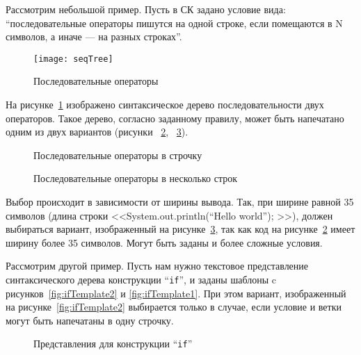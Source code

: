 Рассмотрим небольшой пример.
Пусть в СК задано условие вида: “последовательные операторы пишутся
на одной строке,
если помещаются в N символов, а иначе --- на разных строках”.

\begin{figure}[h!]
	\centering
	\texttt{[image: seqTree]}
	\caption{Последовательные операторы}
	\label{fig:seqImage}
\end{figure}

На рисунке~\ref{fig:seqImage} изображено синтаксическое дерево
последовательности двух операторов. Такое дерево, согласно заданному
правилу, может быть напечатано одним из
двух вариантов (рисунки ~\ref{fig:seqCode1}, ~\ref{fig:seqCode2}).

\begin{figure}[h!]
	\centering
	
	\caption{Последовательные операторы в строчку}
	\label{fig:seqCode1}
\end{figure}

\begin{figure}[h!]
	\centering
	
	\caption{Последовательные операторы в несколько строк}
	\label{fig:seqCode2}
\end{figure}

Выбор происходит в зависимости от ширины вывода. Так, при ширине равной
35 символов (длина строки <<System.out.println(“Hello world”); >>),
должен выбираться вариант, изображенный на рисунке~\ref{fig:seqCode2},
так как код на рисунке~\ref{fig:seqCode1} имеет ширину более 35 символов.
Могут быть заданы и более сложные условия.

Рассмотрим другой пример.
Пусть нам нужно текстовое представление синтаксического дерева конструкции
“\lstinline{if}”, и заданы шаблоны c рисунков~\ref{fig:ifTemplate2} и
\ref{fig:ifTemplate1}. При этом вариант, изображенный на
рисунке~\ref{fig:ifTemplate2} выбирается только в случае, если условие и
ветки могут быть напечатаны в одну строчку.

\begin{figure}[h!]
	\subfloat[]{
		
		\label{fig:ifTemplate2}	
	}
	\quad
	\subfloat[]{
		
		\label{fig:ifTemplate1}	
	}
	\caption{Представления для конструкции “\lstinline{if}”}
\end{figure}


